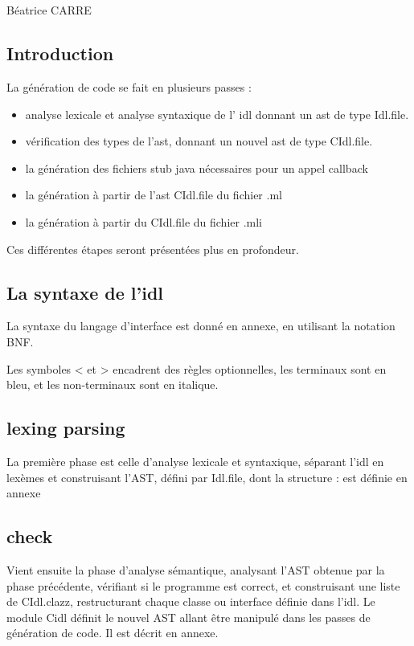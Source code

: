 \documentclass[a4paper, 11pt]{report}
\begin{document}
\chapter{}
Béatrice CARRE

\section*{Introduction}
La génération de code se fait en plusieurs passes :
\begin{itemize}
\item analyse lexicale et analyse syntaxique de l' idl donnant un
  ast de type Idl.file.
\item vérification des types de l'ast, donnant un nouvel ast de type
  CIdl.file.
\item la génération des fichiers stub java nécessaires pour un appel callback 
\item la génération à partir de l'ast CIdl.file du fichier .ml
\item la génération à partir du CIdl.file du fichier .mli
\end{itemize}
Ces différentes étapes seront présentées plus en profondeur.

\section{La syntaxe de l'idl}
La syntaxe du langage d'interface est donné en annexe, en utilisant la
notation BNF.

Les symboles < et > encadrent des règles optionnelles,
les terminaux sont en bleu, et les non-terminaux sont en italique.


\section{lexing parsing}
La première phase est celle d'analyse lexicale et syntaxique,
séparant l'idl en lexèmes et construisant l'AST, défini par Idl.file,
dont la structure : est définie en annexe

\section{check}
Vient ensuite la phase d'analyse sémantique, analysant l'AST obtenue par la
phase précédente, vérifiant si le programme est correct, et
construisant une liste de CIdl.clazz, restructurant chaque classe ou interface définie dans l'idl. 
Le module Cidl définit le nouvel AST allant être manipulé dans les passes de
génération de code. Il est décrit en annexe.
\end{document}
